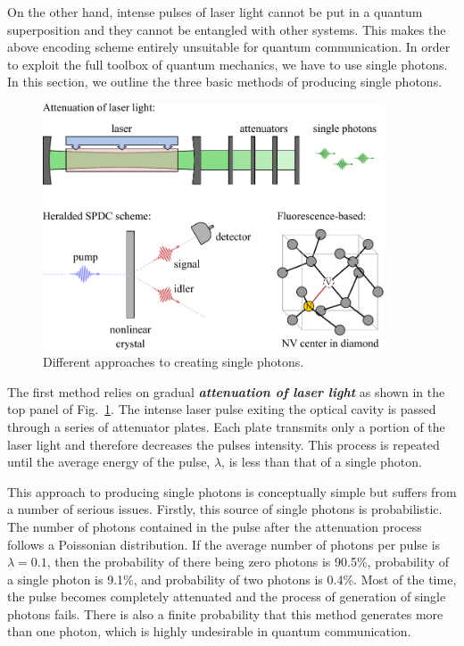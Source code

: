 On the other hand, intense pulses of laser light cannot be put in a quantum superposition and they cannot be entangled with other systems.
This makes the above encoding scheme entirely unsuitable for quantum communication.
In order to exploit the full toolbox of quantum mechanics, we have to use single photons.
In this section, we outline the three basic methods of producing single photons.

\begin{figure}
    \centering
    \includegraphics[width=0.9\textwidth]{lesson5/5-5_single_photons.pdf}
    \caption[Single photon sources]{Different approaches to creating single photons.}
    \label{fig:5-5_single_photons}
\end{figure}

The first method relies on gradual \textit{\textbf{attenuation of laser light}} as shown in
the top panel of Fig.~\ref{fig:5-5_single_photons}.
The intense laser pulse exiting the optical cavity is passed through a series of attenuator plates.
Each plate transmits only a portion of the laser light and therefore decreases the pulses intensity.
This process is repeated until the average energy of the pulse, $\lambda$, is less than that of a single photon.

This approach to producing single photons is conceptually simple but suffers from a number of serious issues.
Firstly, this source of single photons is probabilistic.
The number of photons contained in the pulse after the attenuation process follows a Poissonian distribution.
If the average number of photons per pulse is $\lambda = 0.1$, then the probability of there being zero photons is 90.5\%, probability of a single photon is 9.1\%, and probability of two photons is 0.4\%.
Most of the time, the pulse becomes completely attenuated and the process of generation of single photons fails.
There is also a finite probability that this method generates more than one photon, which is highly undesirable in quantum communication.

